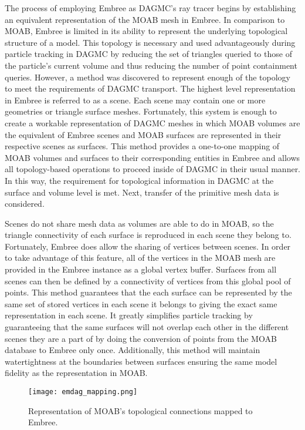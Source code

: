 The process of employing Embree as DAGMC's ray tracer begins by establishing an
equivalent representation of the MOAB mesh in Embree. In comparison to MOAB,
Embree is limited in its ability to represent the underlying topological
structure of a model. This topology is necessary and used advantageously during
particle tracking in DAGMC by reducing the set of triangles queried to those of
the particle's current volume and thus reducing the number of point containment
queries. However, a method was discovered to represent enough of the topology to
meet the requirements of DAGMC transport. The highest level representation in
Embree is referred to as a scene. Each scene may contain one or more geometries
or triangle surface meshes. Fortunately, this system is enough to create a
workable representation of DAGMC meshes in which MOAB volumes are the equivalent
of Embree scenes and MOAB surfaces are represented in their respective scenes as
surfaces. This method provides a one-to-one mapping of MOAB volumes and surfaces
to their corresponding entities in Embree and allows all topology-based
operations to proceed inside of DAGMC in their usual manner. In this way, the
requirement for topological information in DAGMC at the surface and volume level
is met. Next, transfer of the primitive mesh data is considered.

Scenes do not share mesh data as volumes are able to do in MOAB, so the triangle
connectivity of each surface is reproduced in each scene they belong
to. Fortunately, Embree does allow the sharing of vertices between scenes. In
order to take advantage of this feature, all of the vertices in the MOAB mesh
are provided in the Embree instance as a global vertex buffer. Surfaces from all
scenes can then be defined by a connectivity of vertices from this global pool
of points. This method guarantees that the each surface can be represented by
the same set of stored vertices in each scene it belongs to giving the exact
same representation in each scene. It greatly simplifies particle tracking by
guaranteeing that the same surfaces will not overlap each other in the different
scenes they are a part of by doing the conversion of points from the MOAB
database to Embree only once. Additionally, this method will maintain
watertightness at the boundaries between surfaces ensuring the same model
fidelity as the representation in MOAB.

\begin{figure}
  \centering
  \texttt{[image: emdag\_mapping.png]}
  \caption{Representation of MOAB's topological connections mapped
    to Embree.}
  \label{emdag_mapping}
\end{figure}

